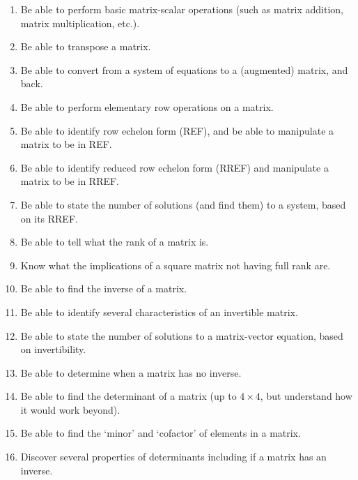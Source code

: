 \documentclass{article}
\begin{document}
\begin{flushleft}
\begin{enumerate}
\item Be able to perform basic matrix-scalar operations (such as matrix addition, matrix multiplication, etc.).
\item Be able to transpose a matrix.
\item Be able to convert from a system of equations to a (augmented) matrix, and back.
\item Be able to perform elementary row operations on a matrix.
\item Be able to identify row echelon form (REF), and be able to manipulate a matrix to be in REF.
\item Be able to identify reduced row echelon form (RREF) and manipulate a matrix to be in RREF.
\item Be able to state the number of solutions (and find them) to a system, based on its RREF.
\item Be able to tell what the rank of a matrix is.
\item Know what the implications of a square matrix not having full rank are.
\item Be able to find the inverse of a matrix.
\item Be able to identify several characteristics of an invertible matrix. 
\item Be able to state the number of solutions to a matrix-vector equation, based on invertibility.
\item Be able to determine when a matrix has no inverse.
\item Be able to find the determinant of a matrix (up to $4 \times 4$, but understand how it would work beyond).
\item Be able to find the `minor' and `cofactor' of elements in a matrix. 
\item Discover several properties of determinants including if a matrix has an inverse.
\end{enumerate}

\end{flushleft}
\end{document}
